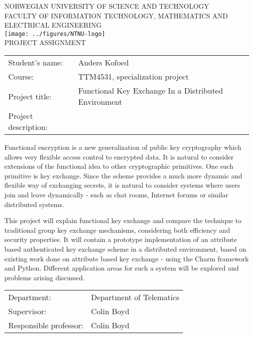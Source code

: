 \documentclass[a4paper,11pt]{article}
\begin{document}
\sffamily
\begin{titlepage}
\begin{center}
\textsc{NORWEGIAN UNIVERSITY OF SCIENCE AND TECHNOLOGY\\
FACULTY OF  INFORMATION TECHNOLOGY, MATHEMATICS AND ELECTRICAL ENGINEERING} \\
\vspace{0.5cm} 
\texttt{[image: ../figures/NTNU-logo]} \\
\vspace{1.0cm}
{\Huge{PROJECT ASSIGNMENT}}
\vspace{1.0cm}
\end{center}

\begin{tabular}{@{}p{5cm}l}
Student's name:		& Anders Kofoed\\
Course: 		& TTM4531, specialization project \\
Project title: 		& Functional Key Exchange In a Distributed Environment \\
Project description: 	& \\
\end{tabular}

Functional encryption is a new generalization of public key cryptography which allows very flexible access
control to encrypted data. It is natural to consider extensions of the functional idea to other cryptographic
primitives. One such primitive is key exchange. 
Since the scheme provides a much more dynamic and flexible way of exchanging secrets, it is natural to consider systems where users join and leave dynamically - such as chat rooms, Internet forums or similar distributed systems. 

This project will explain functional key exchange and compare the technique to traditional group key exchange mechanisms, considering both efficiency and security properties. It will contain a prototype implementation of an attribute based authenticated key exchange scheme in a distributed environment, based on existing work done on attribute based key exchange - using the Charm framework and Python. Different application areas for such a system will be explored and problems arising discussed.



\begin{tabular}{@{}p{5cm}l}
Department:		& Department of Telematics \\
Supervisor:		& Colin Boyd \\
Responsible professor: 	& Colin Boyd \\
\end{tabular}

\end{titlepage}
\end{document}
